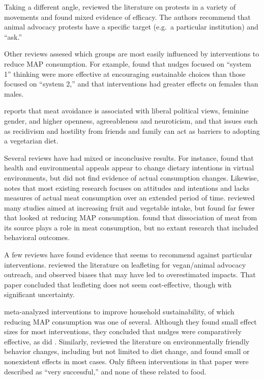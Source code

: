 \documentclass[sn-nature,referee,lineno,pdflatex]{sn-jnl}
\begin{document}
Taking a different angle, \citep{adleberg2018} reviewed the literature
on protests in a variety of movements and found mixed evidence of
efficacy. The authors recommend that animal advocacy protests have a
specific target (e.g.~a particular institution) and ``ask.''

Other reviews assesed which groups are most easily influenced by
interventions to reduce MAP consumption. For example,
\citep{blackford2021} found that nudges focused on ``system 1'' thinking
were more effective at encouraging sustainable choices than those
focused on ``system 2,'' and that interventions had greater effects on
females than males.

\citep{rosenfeld2018} reports that meat avoidance is associated with
liberal political views, feminine gender, and higher openness,
agreeableness and neuroticism, and that issues such as recidivism and
hostility from friends and family can act as barriers to adopting a
vegetarian diet.

Several reviews have had mixed or inconclusive results. For instance,
\citep{bianchi2018conscious} found that health and environmental appeals
appear to change dietary intentions in virtual environments, but did not
find evidence of actual consumption changes. Likewise,
\citep{kwasny2022} notes that most existing research focuses on
attitudes and intentions and lacks measures of actual meat consumption
over an extended period of time. \citep{taufik2019} reviewed many
studies aimed at increasing fruit and vegetable intake, but found far
fewer that looked at reducing MAP consumption. \citep{benningstad2020}
found that dissociation of meat from its source plays a role in meat
consumption, but no extant research that included behavioral outcomes.

A few reviews have found evidence that seems to recommend against
particular interventions. \citep{greig2017} reviewed the literature on
leafleting for vegan/animal advocacy outreach, and observed biases that
may have led to overestimated impacts. That paper concluded that
leafleting does not seem cost-effective, though with significant
uncertainty.

\citep{nisa2019} meta-analyzed interventions to improve household
sustainability, of which reducing MAP consumption was one of several.
Although they found small effect sizes for most interventions, they
concluded that nudges were comparatively effective, as did
\citep{ensaff2021}. Similarly, \citep{rau2022} reviewed the literature
on environmentally friendly behavior changes, including but not limited
to diet change, and found small or nonexistent effects in most cases.
Only fifteen interventions in that paper were described as ``very
successful,'' and none of these related to food.
\end{document}
